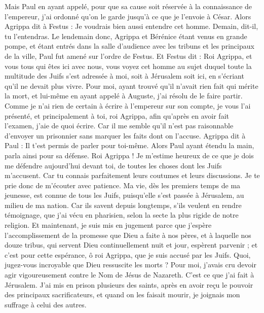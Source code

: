 \begin{multicols}{2}
Mais Paul en ayant appelé, pour que sa cause soit réservée à la connaissance de l’empereur, j’ai ordonné qu’on le garde jusqu’à ce que je l’envoie à César.
Alors Agrippa dit à Festus : Je voudrais bien aussi entendre cet homme. Demain, dit-il, tu l'entendras.
Le lendemain donc, Agrippa et Bérénice étant venus en grande pompe, et étant entrés dans la salle d’audience avec les tribuns et les principaux de la ville, Paul fut amené sur l’ordre de Festus.
Et Festus dit : Roi Agrippa, et vous tous qui êtes ici avec nous, vous voyez cet homme au sujet duquel toute la multitude des Juifs s’est adressée à moi, soit à Jérusalem soit ici, en s’écriant qu'il ne devait plus vivre.
Pour moi, ayant trouvé qu'il n'avait rien fait qui mérite la mort, et lui-même en ayant appelé à Auguste, j'ai résolu de le faire partir.
Comme je n'ai rien de certain à écrire à l'empereur sur son compte, je vous l'ai présenté, et principalement à toi, roi Agrippa, afin qu'après en avoir fait l'examen, j'aie de quoi écrire.
Car il me semble qu'il n'est pas raisonnable d'envoyer un prisonnier sans marquer les faits dont on l'accuse.
\VerseOne{}Agrippa dit à Paul : Il t'est permis de parler pour toi-même. Alors Paul ayant étendu la main, parla ainsi pour sa défense.
Roi Agrippa ! Je m'estime heureux de ce que je dois me défendre aujourd'hui devant toi, de toutes les choses dont les Juifs m’accusent.
Car tu connais parfaitement leurs coutumes et leurs discussions. Je te prie donc de m’écouter avec patience.
Ma vie, dès les premiers temps de ma jeunesse, est connue de tous les Juifs, puisqu’elle s’est passée à Jérusalem, au milieu de ma nation.
Car ils savent depuis longtemps, s'ils veulent en rendre témoignage, que j'ai vécu en pharisien, selon la secte la plus rigide de notre religion.
Et maintenant, je suis mis en jugement parce que j’espère l’accomplissement de la promesse que Dieu a faite à nos pères,
et à laquelle nos douze tribus, qui servent Dieu continuellement nuit et jour, espèrent parvenir ; et c'est pour cette espérance, ô roi Agrippa, que je suis accusé par les Juifs.
Quoi, jugez-vous incroyable que Dieu ressuscite les morts ?
Pour moi, j’avais cru devoir agir vigoureusement contre le Nom de Jésus de Nazareth.
C’est ce que j’ai fait à Jérusalem. J’ai mis en prison plusieurs des saints, après en avoir reçu le pouvoir des principaux sacrificateurs, et quand on les faisait mourir, je joignais mon suffrage à celui des autres.

\end{multicols}
